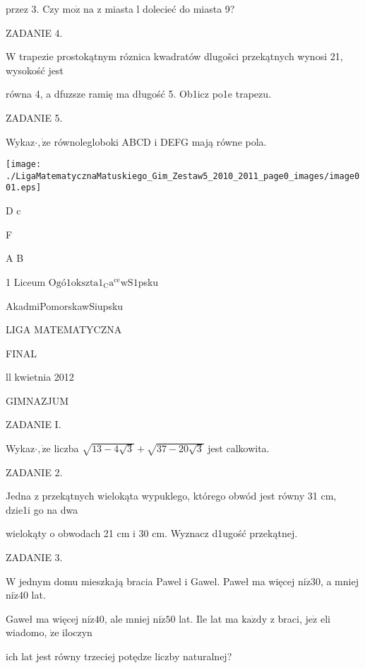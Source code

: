 \documentclass[a4paper,12pt]{article}
\begin{document}
przez 3. Czy $\mathrm{m}\mathrm{o}\dot{\mathrm{z}}$ na z miasta l dolecieć do miasta 9?

ZADANIE 4.

W trapezie prostokątnym róznica kwadratów dlugošci przekątnych wynosi 21, wysokość jest

równa 4, a dfuzsze ramię ma długość 5. Ob1icz po1e trapezu.

ZADANIE 5.

Wykaz$\cdot, \dot{\mathrm{z}}\mathrm{e}$ równolegloboki ABCD $\mathrm{i}$ DEFG mają równe pola.
\begin{center}
\texttt{[image: ./LigaMatematycznaMatuskiego\_Gim\_Zestaw5\_2010\_2011\_page0\_images/image001.eps]}
\end{center}
D  c

F

A  B






1 Liceum O$\mathrm{g}\text{ó} 1\mathrm{o}\mathrm{k}\mathrm{s}\mathrm{z}\mathrm{t}\mathrm{a}1_{\mathrm{C}}\mathrm{a}^{\mathrm{c}\mathrm{e}}\mathrm{w}\mathrm{S}1$psku

AkadmiPomorskawSiupsku

LIGA MATEMATYCZNA

FINAL

ll kwietnia 2012

GIMNAZJUM

ZADANIE I.

Wykaz$\cdot, \dot{\mathrm{z}}\mathrm{e}$ liczba $\sqrt{13-4\sqrt{3}}+\sqrt{37-20\sqrt{3}}$ jest calkowita.

ZADANIE 2.

Jedna z przekątnych wielokąta wypuklego, którego obwód jest równy 31 cm, dzie1i go na dwa

wielokąty o obwodach 21 cm i 30 cm. Wyznacz d1ugość przekątnej.

ZADANIE 3.

$\mathrm{W}$ jednym domu mieszkają bracia Pawel i Gawel. Paweł ma więcej $\mathrm{n}\mathrm{i}\dot{\mathrm{z}}30$, a mniej $\mathrm{n}\mathrm{i}\dot{\mathrm{z}}40$ lat.

Gaweł ma więcej $\mathrm{n}\mathrm{i}\dot{\mathrm{z}}40$, ale mniej $\mathrm{n}\mathrm{i}\dot{\mathrm{z}}50$ lat. Ile lat ma $\mathrm{k}\mathrm{a}\dot{\mathrm{z}}\mathrm{d}\mathrm{y}$ z braci, $\mathrm{j}\mathrm{e}\dot{\mathrm{z}}$ eli wiadomo, $\dot{\mathrm{z}}\mathrm{e}$ iloczyn

ich lat jest równy trzeciej potędze liczby naturalnej?
\end{document}
